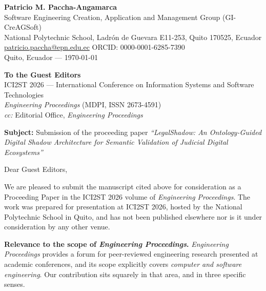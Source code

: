 \documentclass[11pt,a4paper]{article}
\begin{document}
{\raggedright
\textbf{Patricio M. Paccha-Angamarca}\\
Software Engineering Creation, Application and Management Group (GI-CreAGSoft)\\
National Polytechnic School, Ladrón de Guevara E11-253, Quito 170525, Ecuador\\
\href{mailto:patricio.paccha@epn.edu.ec}{patricio.paccha@epn.edu.ec} \quad ORCID: 0000-0001-6285-7390\\[6pt]
Quito, Ecuador --- \today\par}

\vspace{10pt}

{\raggedright
\textbf{To the Guest Editors}\\
ICI2ST 2026 --- International Conference on Information Systems and Software Technologies\\
\emph{Engineering Proceedings} (MDPI, ISSN 2673-4591)\\
\emph{cc:} Editorial Office, \emph{Engineering Proceedings}\par}

\vspace{12pt}

\textbf{Subject:} Submission of the proceeding paper \emph{``LegalShadow: An Ontology-Guided Digital Shadow Architecture for Semantic Validation of Judicial Digital Ecosystems''}

\vspace{10pt}

Dear Guest Editors,

We are pleased to submit the manuscript cited above for consideration as a Proceeding Paper in the ICI2ST 2026 volume of \emph{Engineering Proceedings}. The work was prepared for presentation at ICI2ST 2026, hosted by the National Polytechnic School in Quito, and has not been published elsewhere nor is it under consideration by any other venue.

\vspace{4pt}
\textbf{Relevance to the scope of \emph{Engineering Proceedings}.}
\emph{Engineering Proceedings} provides a forum for peer-reviewed engineering research presented at academic conferences, and its scope explicitly covers \emph{computer and software engineering}. Our contribution sits squarely in that area, and in three specific senses.
\end{document}
